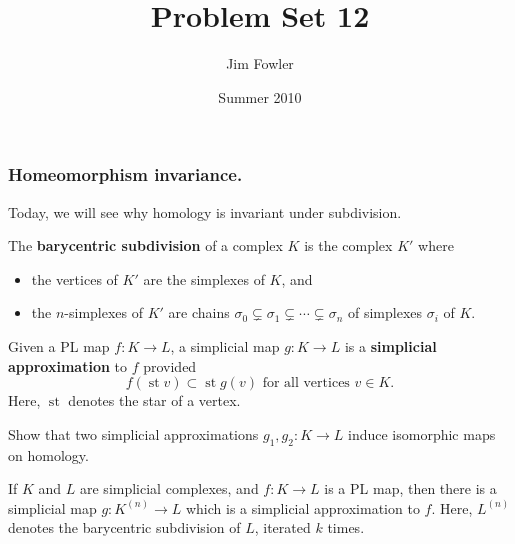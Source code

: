 \documentclass[12pt]{pset}
\title{Problem Set 12}
\author{Jim Fowler}
\date{Summer 2010}
\DeclareMathOperator{\st}{st}
\begin{document}
\maketitle


\subsubsection*{Homeomorphism invariance.} Today, 
we will see why homology is invariant under subdivision.



\begin{definition*}
  The \textbf{barycentric subdivision} of a complex $K$ is the
  complex $K'$ where
  \begin{itemize}
  \item the vertices of $K'$ are the simplexes of $K$, and
  \item the $n$-simplexes of $K'$ are chains $\sigma_0 \subsetneq \sigma_1 \subsetneq \cdots \subsetneq \sigma_n$ of simplexes $\sigma_i$ of $K$.
  \end{itemize}

  \noindent Given a PL map $f : K \to L$, a simplicial map $g : K \to L$ is a
  \textbf{simplicial approximation} to $f$ provided
  $$
  f(\st v) \subset \st g(v) \mbox{ for all vertices $v \in K$.}
  $$
  Here, $\st$ denotes the star of a vertex.
\end{definition*}


\begin{problem}
  Show that two simplicial approximations $g_1, g_2 : K \to L$ induce
  isomorphic maps on homology.
\end{problem}

\begin{theorem*}
  If $K$ and $L$ are simplicial complexes, and $f : K \to L$ is a PL
  map, then there is a simplicial map $g : K^{(n)} \to L$ which is a
  simplicial approximation to $f$.  Here, $L^{(n)}$ denotes the barycentric subdivision of
  $L$, iterated $k$ times.
\end{theorem*}
\end{document}

